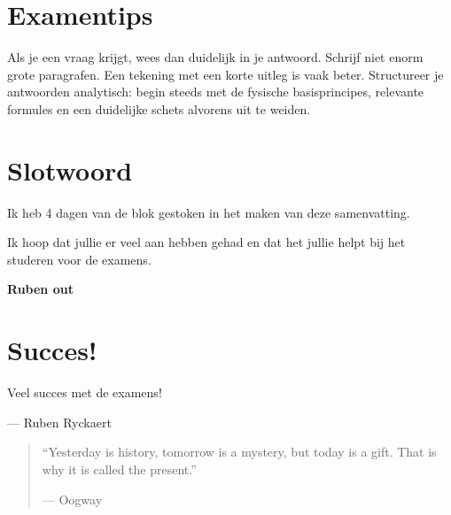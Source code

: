 \documentclass[a4paper,11pt,twoside]{report}
\begin{document}
\chapter{Examentips}

Als je een vraag krijgt, wees dan duidelijk in je antwoord.
Schrijf niet enorm grote paragrafen. Een tekening met een korte uitleg is vaak beter.
Structureer je antwoorden analytisch: begin steeds met de fysische basisprincipes, relevante formules en een duidelijke schets alvorens uit te weiden.

\chapter{Slotwoord}

Ik heb 4 dagen van de blok gestoken in het maken van deze samenvatting.

Ik hoop dat jullie er veel aan hebben gehad en dat het jullie helpt bij het studeren voor de examens.

\textbf{Ruben out}

\newpage

\chapter*{Succes!}

\vfill

\begin{center}

    \itshape\Huge

    Veel succes met de examens!

    \par\vspace{1cm}

    \normalfont\Large

    --- Ruben Ryckaert

\end{center}







\begin{quote}

    \centering

    \itshape\Large

    ``Yesterday is history, tomorrow is a mystery, but today is a gift. That is why it is called the present.''

    \par\vspace{0.5cm}

    \textup{--- Oogway}

\end{quote}

\vfill
\end{document}
